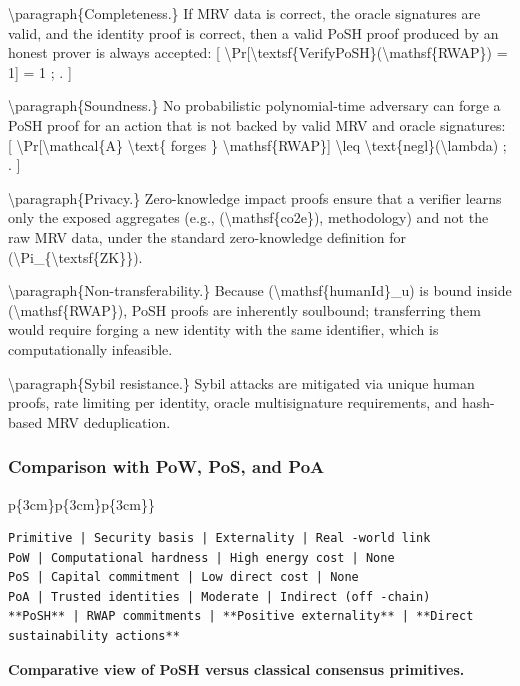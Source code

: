 \documentclass{article}
\begin{document}
{\textbackslash}paragraph\{Completeness.\}
If MRV data is correct, the oracle signatures are valid, and the identity proof
is correct, then a valid PoSH proof produced by an honest prover is always
accepted:
[
{\textbackslash}Pr[{\textbackslash}textsf\{VerifyPoSH\}({\textbackslash}mathsf\{RWAP\}) = 1] = 1 ; .
]

{\textbackslash}paragraph\{Soundness.\}
No probabilistic polynomial-time adversary can forge a PoSH proof for an action
that is not backed by valid MRV and oracle signatures:
[
{\textbackslash}Pr[{\textbackslash}mathcal\{A\} {\textbackslash}text\{ forges \} {\textbackslash}mathsf\{RWAP\}] {\textbackslash}leq {\textbackslash}text\{negl\}({\textbackslash}lambda) ; .
]

{\textbackslash}paragraph\{Privacy.\}
Zero-knowledge impact proofs ensure that a verifier learns only the exposed
aggregates (e.g., ({\textbackslash}mathsf\{co2e\}), methodology) and not the raw MRV data,
under the standard zero-knowledge definition for ({\textbackslash}Pi\_\{{\textbackslash}textsf\{ZK\}\}).

{\textbackslash}paragraph\{Non-transferability.\}
Because ({\textbackslash}mathsf\{humanId\}\_u) is bound inside ({\textbackslash}mathsf\{RWAP\}), PoSH proofs
are inherently soulbound; transferring them would require forging a new identity
with the same identifier, which is computationally infeasible.

{\textbackslash}paragraph\{Sybil resistance.\}
Sybil attacks are mitigated via unique human proofs, rate limiting per identity,
oracle multisignature requirements, and hash-based MRV deduplication.

\subsubsection{Comparison with PoW, PoS, and PoA}

p\{3cm\}p\{3cm\}p\{3cm\}\}

\begin{verbatim}
Primitive | Security basis | Externality | Real -world link 
PoW | Computational hardness | High energy cost | None 
PoS | Capital commitment | Low direct cost | None 
PoA | Trusted identities | Moderate | Indirect (off -chain) 
**PoSH** | RWAP commitments | **Positive externality** | **Direct sustainability actions**
\end{verbatim}

\textbf{Comparative view of PoSH versus classical consensus primitives.}
\end{document}
